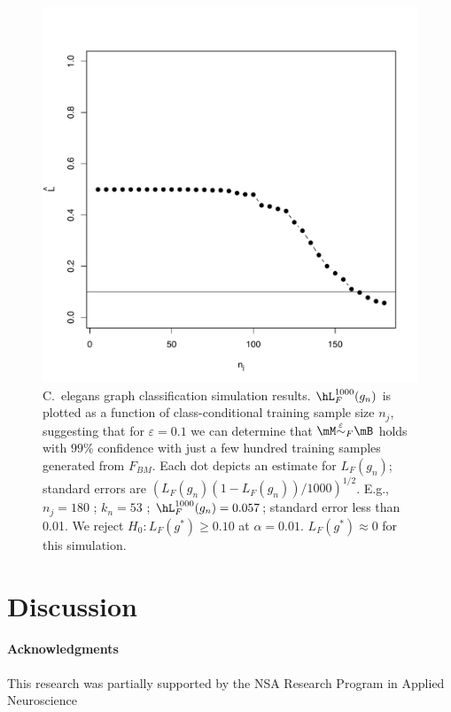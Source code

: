 \begin{figure}[h!]
\centering 
\includegraphics[width=.5\linewidth]{Lhatplot}
\caption{C.~elegans graph classification simulation results. $\hL^{1000}_{F}(g_n)$ is plotted as a function of class-conditional training sample size $n_j$, suggesting that for $\varepsilon=0.1$ we can determine that $\MeB$ holds with $99\%$ confidence with just a few hundred training samples generated from $F_{BM}$. Each dot depicts an estimate for $L_{F}(g_n)$; standard errors are $(L_{F}(g_n)(1-L_{F}(g_n))/1000)^{1/2}$. E.g., $n_j = 180$ ; $k_n = 53$ ; $\hL^{1000}_{F}(g_n) = 0.057$; standard error less than 0.01. We reject $H_0: L_{F}(g^*) \geq 0.10$ at $\alpha=0.01$. $L_{F}(g^*) \approx 0$ for this simulation.}
\label{fig1}
\end{figure}



\section{Discussion} %
\label{sec:discussion}

\paragraph{Acknowledgments}

This research was partially supported by the NSA Research Program in Applied Neuroscience


\appendix
% 


%

%


